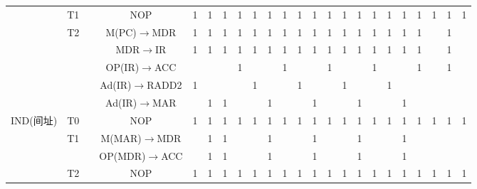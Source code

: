 \documentclass[UTF8]{ctexrep}
\begin{document}
\begin{landscape}
\begin{center}
{\begin{tabular}{|c|c|c|c|c|c|c|c|c|c|c|c|c|c|c|c|c|c|c|c|c|c|c|}
                         & T1                  &      & NOP                                  & 1    & 1    & 1    & 1    & 1    & 1    & 1    & 1    & 1    & 1    & 1    & 1    & 1    & 1   & 1   & 1   & 1   & 1   & 1   \\ \cline{2-23} 
                         & \multirow{5}{*}{T2} &      & M(PC)$\to$MDR              & 1    & 1    & 1    & 1    & 1    & 1    & 1    & 1    & 1    & 1    & 1    & 1    & 1    & 1   & 1   & 1   &     & 1   &     \\ \cline{3-23} 
                         &                     &      & MDR$\to$IR                 & 1    & 1    & 1    & 1    & 1    & 1    & 1    & 1    & 1    & 1    & 1    & 1    & 1    & 1   & 1   & 1   &     & 1   &     \\ \cline{3-23} 
                         &                     &      & OP(IR)$\to$ACC             &      &      &      & 1    &      &      & 1    &      &      & 1    &      &      & 1    &     &     & 1   &     & 1   &     \\ \cline{3-23} 
                         &                     &      & Ad(IR)$\to$RADD2           & 1    &      &      &      & 1    &      &      & 1    &      &      & 1    &      &      & 1   &     &     &     &     &     \\ \cline{3-23} 
                         &                     &      & Ad(IR)$\to$MAR             &      & 1    & 1    &      &      & 1    &      &      & 1    &      &      & 1    &      &     & 1   &     &     &     &     \\ \hline
\multirow{4}{*}{IND(间址)} & T0                  &      & NOP                                  & 1    & 1    & 1    & 1    & 1    & 1    & 1    & 1    & 1    & 1    & 1    & 1    & 1    & 1   & 1   & 1   & 1   & 1   & 1   \\ \cline{2-23} 
                         & \multirow{2}{*}{T1} &      & M(MAR)$\to$MDR             &      & 1    & 1    &      &      & 1    &      &      & 1    &      &      & 1    &      &     & 1   &     &     &     &     \\ \cline{3-23} 
                         &                     &      & OP(MDR)$\to$ACC            &      & 1    & 1    &      &      & 1    &      &      & 1    &      &      & 1    &      &     & 1   &     &     &     &     \\ \cline{2-23} 
                         & T2                  &      & NOP                                  & 1    & 1    & 1    & 1    & 1    & 1    & 1    & 1    & 1    & 1    & 1    & 1    & 1    & 1   & 1   & 1   & 1   & 1   & 1   \\ \hline

\end{tabular}}
\end{center}
\end{landscape}
\end{document}
